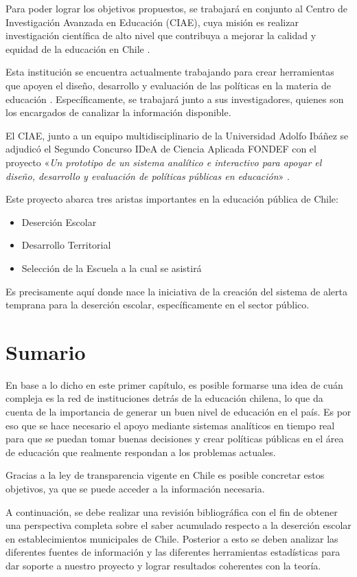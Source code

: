 Para poder lograr los objetivos propuestos, se trabajará en conjunto al Centro de Investigación Avanzada en Educación (CIAE), cuya misión es realizar investigación científica de alto nivel que contribuya a mejorar la calidad y equidad de la educación en Chile \cite{ciae}.

Esta institución se encuentra actualmente trabajando para crear herramientas que apoyen el diseño, desarrollo y evaluación de las políticas en la materia de educación \cite{tools}. Específicamente, se  trabajará junto a sus investigadores, quienes son los encargados de canalizar la información disponible.

El CIAE, junto a un equipo multidisciplinario de la Universidad Adolfo Ibáñez se adjudicó el Segundo Concurso IDeA de Ciencia Aplicada FONDEF con el proyecto «\textit{Un prototipo de un sistema analítico e interactivo para apoyar el diseño, desarrollo y evaluación de políticas públicas en educación}» \cite{noticia}. 

Este proyecto abarca tres aristas importantes en la educación pública de Chile:
\begin{itemize}
    \item Deserción Escolar
    \item Desarrollo Territorial
    \item Selección de la Escuela a la cual se asistirá
\end{itemize}

Es precisamente aquí donde nace la iniciativa de la creación del sistema de alerta temprana para la deserción escolar, específicamente en el sector público. 

\section{Sumario}

En base a lo dicho en este primer capítulo, es posible formarse una idea de cuán compleja es la red de instituciones detrás de la educación chilena, lo que da cuenta de la importancia de generar un buen nivel de educación en el país. Es por eso que se hace necesario el apoyo mediante sistemas analíticos en tiempo real para que se puedan tomar buenas decisiones y crear políticas públicas en el área de educación que realmente respondan a los problemas actuales. 

Gracias a la ley de transparencia vigente en Chile es posible concretar estos objetivos, ya que se puede acceder a la información necesaria.

A continuación, se debe realizar una revisión bibliográfica con el fin de obtener una perspectiva completa sobre el saber acumulado respecto a la deserción escolar en establecimientos municipales de Chile. Posterior a esto se deben analizar las diferentes fuentes de información y las diferentes herramientas estadísticas para dar soporte a nuestro proyecto y lograr resultados coherentes con la teoría. 